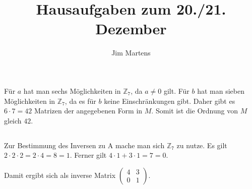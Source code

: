 \documentclass[10pt,a4paper,oneside,ngerman,numbers=noenddot]{scrartcl}
\begin{document}
\author{Jim Martens}
\title{Hausaufgaben zum 20./21. Dezember}
\maketitle
\section{} %
\subsection{} %
Für $a$ hat man sechs Möglichkeiten in $\mathbb{Z}_{7}$, da $a \neq 0$ gilt. Für $b$ hat man sieben Möglichkeiten in $\mathbb{Z}_{7}$, da es für $b$ keine Einschränkungen gibt. Daher gibt es $6 \cdot 7 = 42$ Matrizen der angegebenen Form in $M$. Somit ist die Ordnung von $M$ gleich $42$.
\subsection{} %
Zur Bestimmung des Inversen zu A mache man sich $\mathbb{Z}_{7}$ zu nutze. Es gilt $2 \cdot 2 \cdot 2 = 2 \cdot 4 = 8 = 1$. Ferner gilt $4 \cdot 1 + 3 \cdot 1 = 7 = 0$.

Damit ergibt sich als inverse Matrix $\begin{pmatrix} 4 & 3 \\ 0 & 1 \end{pmatrix}$.
\end{document}
